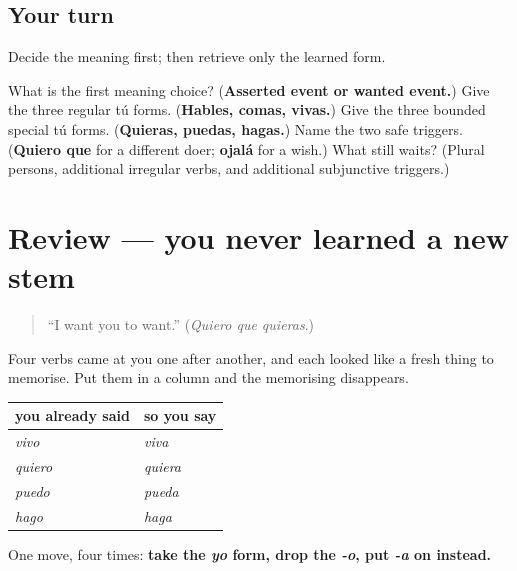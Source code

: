 \subsection*{Your turn}
Decide the meaning first; then retrieve only the learned form.

\begin{tcolorbox}[breakable,colback=teal!4,colframe=teal!35!black,title={Before you move on}]
What is the first meaning choice? (\textbf{Asserted event or wanted event.}) Give the three regular tú forms. (\textbf{Hables, comas, vivas.}) Give the three bounded special tú forms. (\textbf{Quieras, puedas, hagas.}) Name the two safe triggers. (\textbf{Quiero que} for a different doer; \textbf{ojalá} for a wish.) What still waits? (Plural persons, additional irregular verbs, and additional subjunctive triggers.)
\end{tcolorbox}
\section[(review)]{Review — you never learned a new stem}

\label{lesson:ES-C18-repaso-el-yo-que-viaja}



\begin{quote}
\textquotedblleft{}I want you to want.\textquotedblright{} (\emph{Quiero que quieras}.)
\end{quote}

\begin{grammarlens}[title={What you've built}]
Four verbs came at you one after another, and each looked like a fresh thing to memorise. Put them in a column and the memorising disappears.

\noindent
\begin{tabularx}{\linewidth}{@{}>{\raggedright\arraybackslash}X>{\raggedright\arraybackslash}X@{}}
\toprule
\textbf{you already said} & \textbf{so you say} \\
\midrule
\emph{vivo} & \emph{viva} \\
\emph{quiero} & \emph{quiera} \\
\emph{puedo} & \emph{pueda} \\
\emph{hago} & \emph{haga} \\
\bottomrule
\end{tabularx}

One move, four times: \textbf{take the \emph{yo} form, drop the \emph{-o}, put \emph{-a} on instead.}
\end{grammarlens}

